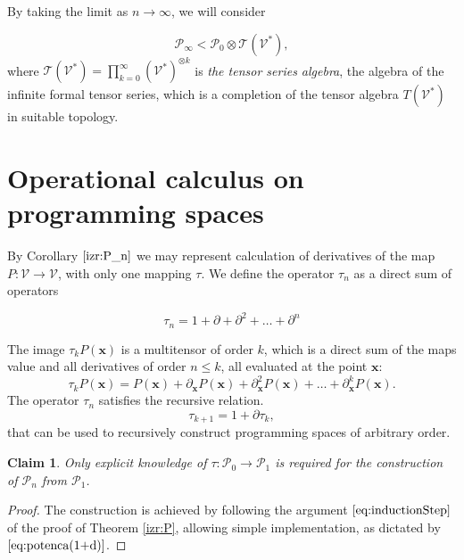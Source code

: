 \documentclass[smallcondensed]{svjour3}
\newcommand{\T}{\mathcal{T}}
\newcommand{\VV}{\mathcal{V}}
\newcommand{\x}{\mathbf{x}}
\newcommand{\dP}{\mathcal{P}}
\newcommand{\D}{\partial}
\newcommand{\sumd}{\tau}
\newtheorem{trditev}{Claim}[section]
\begin{document}
By taking the limit as $n\to \infty$, we will consider 
 	
 	\begin{equation}
 	\label{eq:P_algebra}
 	 	    \dP_\infty < \dP_0\otimes \T(\VV^*),
 	\end{equation}
where $\T(\VV^*)=\prod_{k=0}^\infty (\VV^*)^{\otimes k}$ is \emph{the tensor series
  algebra}, the algebra of the  infinite formal tensor series,
which is a completion of the tensor algebra $T(\VV^*)$ in suitable topology.

\section{Operational calculus on programming spaces}\label{sec:operational}



By Corollary $\ref{izr:P_n}$ we may represent calculation of derivatives of the
map $P:\VV\to \VV$, with only one mapping $\sumd$. We define the operator
$\sumd_n$ as a direct sum of operators
 
 \begin{equation}\label{eq:DD}
  	\sumd_n = 1+\D +\D^2 +\ldots + \D^n 
  \end{equation}
  
The image $\sumd_kP(\x)$ is a multitensor of order $k$, which is a direct sum of the maps value and all derivatives of order $n\le k$, all evaluated at the point $\x$:
\begin{equation}
  \label{eq:multi_odvod}
  \sumd_kP(\x) = P(\mathbf{x})+\partial_\mathbf{x} P(\mathbf{x}) + \partial^2_\mathbf{x} P(\mathbf{x}) + \ldots + \partial^k_\mathbf{x} P(\mathbf{x}).
\end{equation}
The operator $\sumd_n$ satisfies the recursive relation.
  \begin{equation}
    \label{eq:potenca(1+d)}
    \sumd_{k+1}=1+\D\sumd_{k},
  \end{equation}
that can be used to recursively construct programming spaces of arbitrary order. 
\begin{trditev}
Only explicit knowledge of $\sumd:\dP_0\to\dP_1$ is required for the
construction of $\dP_n$ from $\dP_1$. 
\end{trditev}
\begin{proof}
  The construction is achieved by following the argument $\eqref{eq:inductionStep}$ of the proof of Theorem \ref{izr:P}, allowing simple implementation, as dictated by $\eqref{eq:potenca(1+d)}$. 
\end{proof}
        
\end{document}
